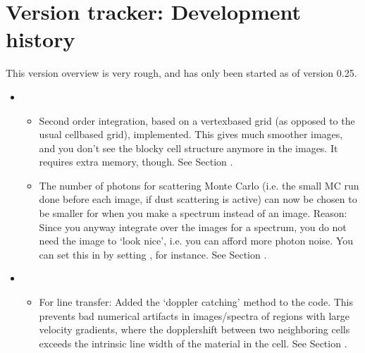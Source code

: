 \documentclass[letterpaper,10pt,english]{sphinxmanual}
\begin{document}
\chapter{Version tracker: Development history}
\label{\detokenize{versiontracker:version-tracker-development-history}}\label{\detokenize{versiontracker:chap-development-history}}\label{\detokenize{versiontracker::doc}}
This version overview is very rough, and has only been started as of version
0.25.
\begin{itemize}
\item {} 
\begin{itemize}
\item {} 
Second order integration, based on a vertex\sphinxhyphen{}based grid (as opposed to
the usual cell\sphinxhyphen{}based grid), implemented. This gives much smoother images,
and you don’t see the blocky cell structure anymore in the images. It
requires extra memory, though. See Section {\hyperref[\detokenize{imagesspectra:sec-second-order}]{}}.

\item {} 
The number of photons for scattering Monte Carlo (i.e. the small MC
run done before each image, if dust scattering is active) can now be
chosen to be smaller for when you make a spectrum instead of an
image. Reason: Since you anyway integrate over the images for a
spectrum, you do not need the image to ‘look nice’, i.e. you can
afford more photon noise. You can set this in  by
setting , for instance. See Section
{\hyperref[\detokenize{dustradtrans:sec-scat-monte-carlo}]{}}.

\end{itemize}

\item {} 
\begin{itemize}
\item {} 
For line transfer: Added the ‘doppler catching’ method to the
code. This prevents bad numerical artifacts in images/spectra of regions
with large velocity gradients, where the doppler\sphinxhyphen{}shift between two
neighboring cells exceeds the intrinsic line width of the material in
the cell. See Section {\hyperref[\detokenize{lineradtrans:sec-doppler-catching}]{}}.


\end{itemize}
\end{itemize}
\end{document}
